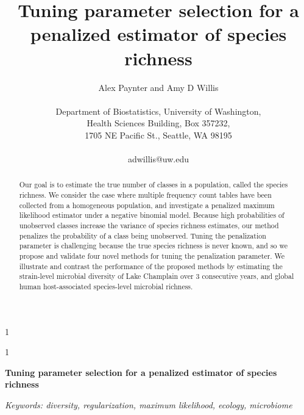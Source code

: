 \documentclass[12pt]{article}
\newcommand{\blind}{1}
\begin{document}
%

\def\spacingset#1{\renewcommand{\baselinestretch}%
{#1}\small\normalsize} \spacingset{1}



\blind
{
  \title{\bf Tuning parameter selection for a penalized estimator of species richness}
  \author{Alex Paynter and Amy D Willis\\ \\
  Department of Biostatistics, University of Washington,\\
  Health Sciences Building, Box 357232,\\
  1705 NE Pacific St., Seattle, WA 98195 \\ \\
  adwillis@uw.edu}

  \maketitle
} \fi

\blind
{
  \bigskip
  \bigskip
  \bigskip
  \begin{center}
    {\LARGE\bf Tuning parameter selection for a penalized estimator of species richness}
\end{center}
  \medskip
} \fi

\bigskip
\begin{abstract}
Our goal is to estimate the true number of classes in a population, called the species richness.  We consider the case where multiple frequency count tables have been collected from a homogeneous population, and investigate a penalized maximum likelihood estimator under a negative binomial model.  Because high probabilities of unobserved classes increase the variance of species richness estimates, our method penalizes the probability of a class being unobserved. Tuning the penalization parameter is challenging because the true species richness is never known, and so we propose and validate four novel methods for tuning the penalization parameter.  We illustrate and contrast the performance of the proposed methods by estimating the strain-level microbial diversity of Lake Champlain over 3 consecutive years, and global human host-associated species-level microbial richness.
\end{abstract}

\noindent%
{\it Keywords: diversity, regularization, maximum likelihood, ecology,  microbiome}
\vfill
\end{document}
